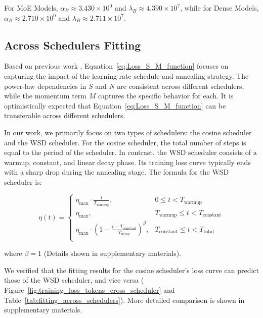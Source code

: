 \documentclass[letterpaper]{article} %
\begin{document}
For MoE Models, \( \alpha_B \approx 3.430 \times 10^0 \) and \( \lambda_B \approx 4.390 \times 10^7 \), while for Dense Models, \( \alpha_B \approx 2.710 \times 10^0 \) and \( \lambda_B \approx 2.711 \times 10^7 \).



\subsection{Across Schedulers Fitting}\label{subsec:across_schedulers_fitting}

Based on previous work \citep{tissue2024scaling}, Equation~\ref{eq:Loss_S_M_function} focuses on capturing the impact of the learning rate schedule and annealing strategy. The power-law dependencies in \(S\) and \(N\) are consistent across different schedulers, while the momentum term \(M\) captures the specific behavior for each. It is optimistically expected that Equation~\ref{eq:Loss_S_M_function} can be transferable across different schedulers.

In our work, we primarily focus on two types of schedulers: the cosine scheduler and the WSD scheduler. For the cosine scheduler, the total number of steps is equal to the period of the scheduler. In contrast, the WSD scheduler consists of a warmup, constant, and linear decay phase. Its training loss curve typically ends with a sharp drop during the annealing stage. The formula for the WSD scheduler is:


\begin{equation}
    \eta(t) =
    \begin{cases}
    \eta_{\text{max}} \cdot \frac{t}{T_{\text{warmup}}}, & 0 \leq t < T_{\text{warmup}} \\
    \eta_{\text{max}}, & T_{\text{warmup}} \leq t < T_{\text{constant}} \\
    \eta_{\text{max}} \cdot \left(1 - \frac{t -T_{\text{constant}}}{T_{\text{decay}}}\right)^{\beta}, & T_{\text{constant}} \leq t < T_{\text{total}} \\
    \end{cases}
\label{eq:WSD_definition}
\end{equation}

\noindent where \(\beta = 1\) (Details shown in supplementary materials).


We verified that the fitting results for the cosine scheduler’s loss curve can predict those of the WSD scheduler, and vice versa ( Figure~\ref{fig:training_loss_tokens_cross_scheduler} and Table~\ref{tab:fitting_across_schedulers}). More detailed comparison is shown in supplementary materials.
\end{document}
